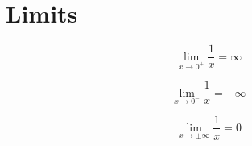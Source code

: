 \documentclass{article}
\begin{document}
\section*{Limits}

\[\lim_{x \to 0^{+}} \frac{1}{x} = \infty\]

\[\lim_{x \to 0^{-}} \frac{1}{x} = -\infty\]

\[\lim_{x \to \pm\infty} \frac{1}{x} = 0\]
\end{document}
